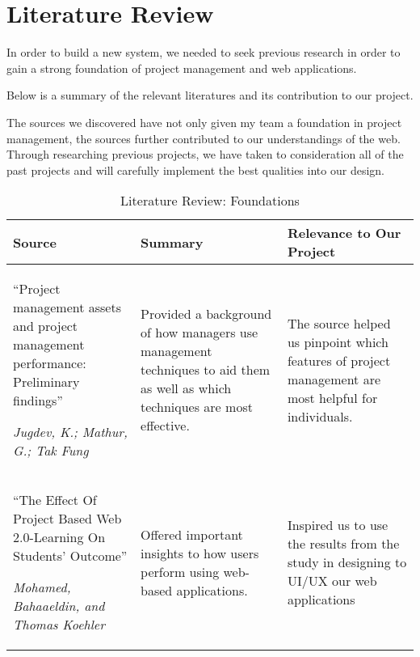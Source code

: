 \section{Literature Review}

In order to build a new system, we needed to seek previous research in order to gain a strong foundation of project management and web applications. 
\par Below is a summary of  the relevant literatures and its contribution to our project.

\par The sources we discovered have not only given my team a foundation in project management, the sources further contributed to our understandings of the web. Through researching previous projects, we have taken to consideration all of the past projects and will carefully implement the best qualities into our design. 

\FloatBarrier
\begin{table}%
\caption{Literature Review: Foundations}\label{FoundationLitReview}
\begin{tabularx}{\textwidth}{|X|X|X|}
    \hline
    \textbf{Source} & \textbf{Summary} & \textbf{Relevance to Our Project}\\
    \hline
    ``Project management assets and project management performance: Preliminary findings''
     \par \textit{Jugdev, K.; Mathur, G.; Tak Fung} & Provided a background of how managers use management techniques to aid them as well as which techniques are most effective. & The source helped us pinpoint which features of project management are most helpful for individuals. \\
    \hline 
    ``The Effect Of Project Based Web 2.0-Learning On Students' Outcome''
	\par \textit{Mohamed, Bahaaeldin, and Thomas Koehler} & Offered important insights to how users perform using web-based applications. & Inspired us to use the results from the study in designing to UI/UX our web applications \\
	\hline
\end{tabularx}
\end{table}%

